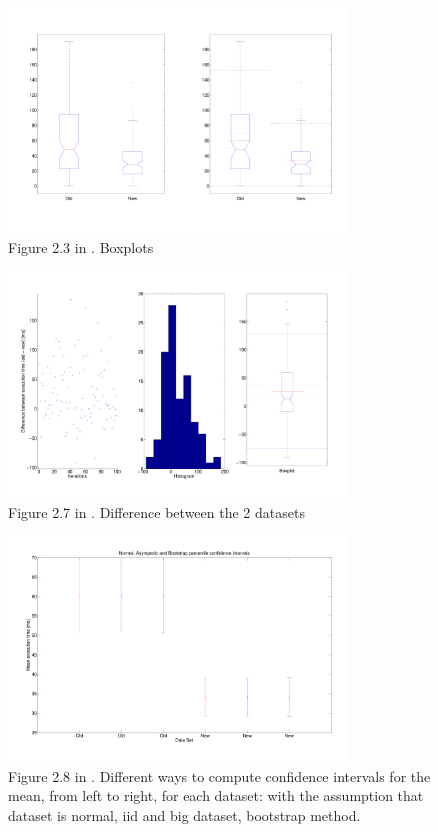 \documentclass[10pt]{article}
\begin{document}
\begin{figure}[h!]
  \centering
  \includegraphics[width=0.8\textwidth]{images/hw1_1_23.pdf}
  \caption{Figure 2.3 in \cite{leb}. Boxplots}
  \label{fig:23}
\end{figure}

\begin{figure}[h!]
  \centering
  \includegraphics[width=0.8\textwidth]{images/hw1_1_27.pdf}
  \caption{Figure 2.7 in \cite{leb}. Difference between the 2 datasets}
  \label{fig:27}
\end{figure}

\begin{figure}[h!]
  \centering
  \includegraphics[width=0.8\textwidth]{images/hw1_1_28.pdf}
  \caption{Figure 2.8 in \cite{leb}. Different ways to compute confidence intervals for the mean, from left to right, for each dataset: with the assumption that dataset is normal, iid and big dataset, bootstrap method.}
  \label{fig:28}
\end{figure}
\end{document}
